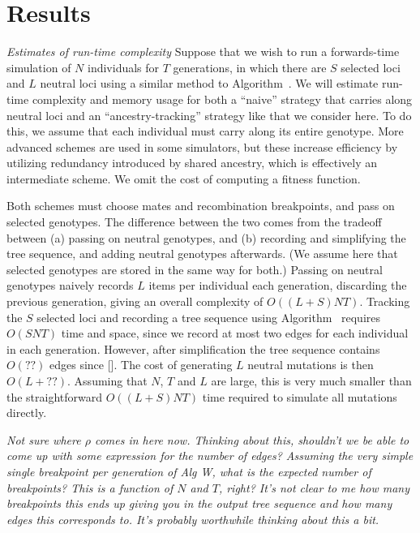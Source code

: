 \documentclass{article}
\newcommand{\plr}[1]{{\em \color{blue} #1}}
\newcommand{\jk}[1]{{\em \color{red} #1}}
\begin{document}
\section*{Results}

\plr{Estimates of run-time complexity}
Suppose that we wish to run a forwards-time simulation of $N$ individuals for $T$ generations,
in which there are $S$ selected loci and $L$ neutral loci using a similar
method to Algorithm~.
We will estimate run-time complexity and memory usage for both a ``naive'' strategy that carries along neutral loci
and an ``ancestry-tracking'' strategy like that we consider here.
To do this, we assume that each individual must carry along its entire genotype.
More advanced schemes are used in some simulators,
but these increase efficiency by utilizing redundancy introduced by shared ancestry,
which is effectively an intermediate scheme.
We omit the cost of computing a fitness function.

Both schemes must choose mates and recombination breakpoints,
and pass on selected genotypes.
The difference between the two comes from the tradeoff between
(a) passing on neutral genotypes, and
(b) recording and simplifying the tree sequence, and adding neutral genotypes afterwards.
(We assume here that selected genotypes are stored in the same way for both.)
Passing on neutral genotypes naively records $L$ items per individual each
generation, discarding the previous generation, giving an overall complexity of
$O((L + S) NT)$. Tracking the $S$ selected loci and recording a tree sequence
using Algorithm~ requires $O(SNT)$ time and space, since we
record at most two edges for each individual in each generation.
However, after simplification the tree sequence contains
$O(??)$ edges since []. The cost of generating $L$ neutral mutations
is then $O(L + ??)$. Assuming that $N$, $T$ and $L$ are large, this is
very much smaller than the straightforward $O((L + S) NT)$ time required
to simulate all mutations directly.

\jk{Not sure where $\rho$ comes in here now. Thinking about this, shouldn't we
be able to come up with some expression for the number of edges? Assuming
the very simple single breakpoint per generation of Alg W, what is the
expected number of breakpoints? This is a function of $N$ and $T$, right?
It's not clear to me how many breakpoints this ends up giving you in
the output tree sequence and how many edges this corresponds to.
It's probably worthwhile thinking about this a bit.}
\end{document}
